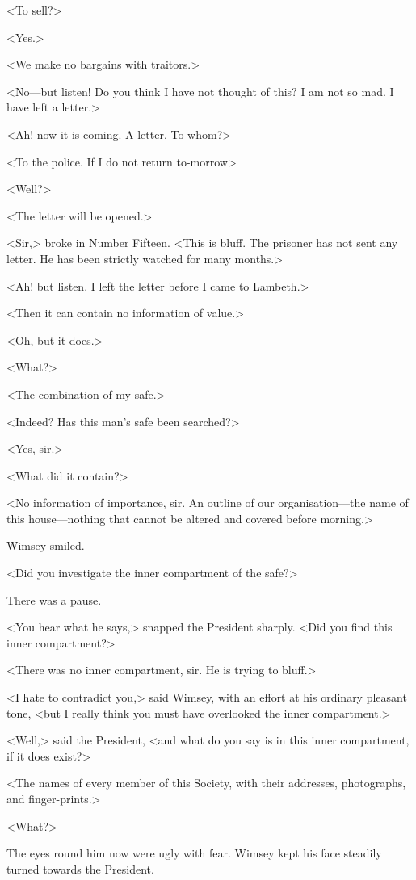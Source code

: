 <To sell?>

<Yes.>

<We make no bargains with traitors.>

<No—but listen! Do you think I have not thought of this? I am not so mad. I have left a letter.>

<Ah! now it is coming. A letter. To whom?>

<To the police. If I do not return to-morrow\longdash>

<Well?>

<The letter will be opened.>

<Sir,> broke in Number Fifteen. <This is bluff. The prisoner has not sent any letter. He has been strictly watched for many months.>

<Ah! but listen. I left the letter before I came to Lambeth.>

<Then it can contain no information of value.>

<Oh, but it does.>

<What?>

<The combination of my safe.>

<Indeed? Has this man's safe been searched?>

<Yes, sir.>

<What did it contain?>

<No information of importance, sir. An outline of our organisation—the name of this house—nothing that cannot be altered and covered before morning.>

Wimsey smiled.

<Did you investigate the inner compartment of the safe?>

There was a pause.

<You hear what he says,> snapped the President sharply. <Did you find this inner compartment?>

<There was no inner compartment, sir. He is trying to bluff.>

<I hate to contradict you,> said Wimsey, with an effort at his ordinary pleasant tone, <but I really think you must have overlooked the inner compartment.>

<Well,> said the President, <and what do you say is in this inner compartment, if it does exist?>

<The names of every member of this Society, with their addresses, photographs, and finger-prints.>

<What?>

The eyes round him now were ugly with fear. Wimsey kept his face steadily turned towards the President.

